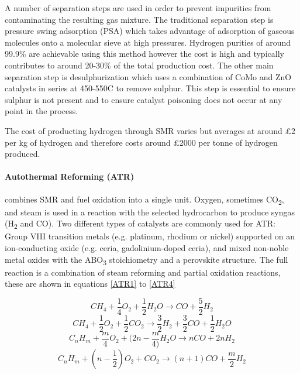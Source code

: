 A number of separation steps are used in order to prevent impurities from contaminating the 
resulting gas mixture. The traditional separation step is pressure swing adsorption (PSA) which takes 
advantage of adsorption of gaseous molecules onto a molecular sieve at high pressures. Hydrogen purities of around 99.9\% are achievable using this method however the cost is high and typically contributes to around 
20-30\% of the total production cost. \cite{Muradov2015} The other main separation step is desulphurization which uses a 
combination of CoMo and ZnO catalysts in series at 450-550\textdegree C to remove sulphur. \cite{Muradov2015}
This step is essential to ensure sulphur is not present and to ensure catalyst 
poisoning does not occur at any point in the process. 

The cost of producting hydrogen through SMR varies but averages at around £2 per kg of hydrogen and therefore costs around £2000 per tonne of hydrogen produced. \cite{hydrogencouncil_2020}

\paragraph{Autothermal Reforming (ATR)} combines SMR and fuel oxidation into a single unit. \cite{SPEIGHT2015119} Oxygen, sometimes CO\textsubscript{2}, and steam is used in a reaction with the selected hydrocarbon to produce syngas (H\textsubscript{2} and CO). Two different types of catalysts are commonly used for ATR:  Group VIII transition metals (e.g. platinum, rhodium or nickel) supported on an ion-conducting oxide (e.g. ceria, gadolinium-doped ceria), and mixed non-noble metal oxides with the ABO\textsubscript{3} stoichiometry and a perovskite structure. \cite{SUI2016461} The full reaction is a combination of steam reforming and partial oxidation reactions, these are shown in equations \ref{ATR1} to \ref{ATR4}\cite{SUI2016461}

\begin{equation} \label{ATR1}
    CH_{4} + \frac{1}{4}O_2 + \frac{1}{2}H_2O \rightarrow CO + \frac{5}{2} H_2
\end{equation}
\begin{equation} \label{ATR2}
    CH_{4} + \frac{1}{2}O_2 + \frac{1}{2}CO_2 \rightarrow \frac{3}{2} H_2 + \frac{3}{2}CO + \frac{1}{2} H_2O
\end{equation}
\begin{equation} \label{ATR3}
    C_nH_m + \frac{m}{4}O_2 + (2n-\frac{m}{4)}H_2O \rightarrow nCO +2nH_2
\end{equation}
\begin{equation} \label{ATR4}
    C_nH_m + (n-\frac{1}{2})O_2 + CO_2 \rightarrow (n+1)CO +\frac{m}{2}H_2
\end{equation}

